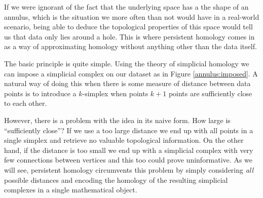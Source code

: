 If we were ignorant of the fact that the underlying space has a the shape of an annulus, which is the situation we more often than not would have in a real-world scenario, being able to deduce the topological properties of this space would tell us that data only lies around a hole. This is where persistent homology comes in as a way of approximating homology without anything other than the data itself.

The basic principle is quite simple. Using the theory of simplicial homology we can impose a simplicial complex on our dataset as in Figure \ref{annulus:imposed}. A natural way of doing this when there is some measure of distance between data points is to introduce a $k$-simplex when points $k+1$ points are sufficiently close to each other.

However, there is a problem with the idea in its naive form. How large is ``sufficiently close''? If we use a too large distance we end up with all points in a single simplex and retrieve no valuable topological information. On the other hand, if the distance is too small we end up with a simplicial complex with very few connections between vertices and this too could prove uninformative. As we will see, persistent homology circumvents this problem by simply considering \textit{all} possible distances and encoding the homology of the resulting simplicial complexes in a single mathematical object.





